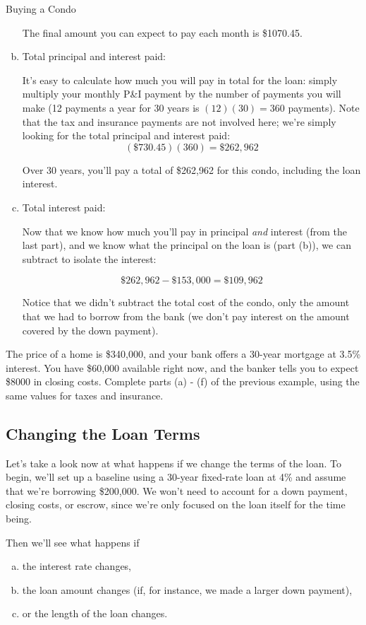 \begin{example}{Buying a Condo}
\begin{enumerate}[(a)]
The final amount you can expect to pay each month is \$1070.45.

\item Total principal and interest paid:

It's easy to calculate how much you will pay in total for the loan: simply multiply your monthly P\&I payment by the number of payments you will make (12 payments a year for 30 years is $(12)(30) = 360$ payments).  Note that the tax and insurance payments are not involved here; we're simply looking for the total principal and interest paid:
\[(\$730.45)(360) = \boxed{\$262,962}\]

Over 30 years, you'll pay a total of \$262,962 for this condo, including the loan interest.

\item Total interest paid:

Now that we know how much you'll pay in principal \emph{and} interest (from the last part), and we know what the principal on the loan is (part (b)), we can subtract to isolate the interest:

\[\$262,962 - \$153,000 = \boxed{\$109,962}\]

Notice that we didn't subtract the total cost of the condo, only the amount that we had to borrow from the bank (we don't pay interest on the amount covered by the down payment).
\end{enumerate}
\end{example}

\begin{try}
The price of a home is \$340,000, and your bank offers a 30-year mortgage at 3.5\% interest.  You have \$60,000 available right now, and the banker tells you to expect \$8000 in closing costs.  Complete parts (a) - (f) of the previous example, using the same values for taxes and insurance.
\end{try}
\pagebreak

\subsection{Changing the Loan Terms}
Let's take a look now at what happens if we change the terms of the loan.  To begin, we'll set up a baseline using a 30-year fixed-rate loan at 4\% and assume that we're borrowing \$200,000.  We won't need to account for a down payment, closing costs, or escrow, since we're only focused on the loan itself for the time being.

Then we'll see what happens if 
\begin{enumerate}[(a)]
\item the interest rate changes,
\item the loan amount changes (if, for instance, we made a larger down payment),
\item or the length of the loan changes.
\end{enumerate}

